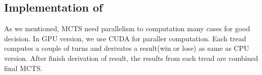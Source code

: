 \subsection{Implementation of \gpu}
As we mentioned, MCTS need parallelism to computation many cases for good decision. 
In GPU version, we use CUDA for paraller computation. 
Each tread computes a couple of turns and derivates a result(win or lose) as same as CPU version. 
After finish derivation of result, the results from each tread are combined final MCTS. 